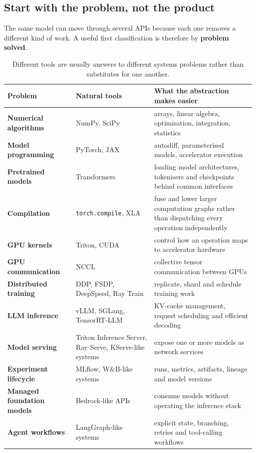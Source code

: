 \subsection{Start with the problem, not the product}

The same model can move through several APIs because each one removes a different kind of work.
A useful first classification is therefore by \textbf{problem solved}.

\begin{table}[ht]
\centering
\small
\begin{tabularx}{\textwidth}{>{\bfseries}p{2.6cm} X X}
\toprule
Problem & Natural tools & What the abstraction makes easier \\
\midrule
Numerical algorithms & NumPy, SciPy & arrays, linear algebra, optimisation, integration, statistics \\
Model programming & PyTorch, JAX & autodiff, parameterised models, accelerator execution \\
Pretrained models & Transformers & loading model architectures, tokenisers and checkpoints behind common interfaces \\
Compilation & \texttt{torch.compile}, XLA & fuse and lower larger computation graphs rather than dispatching every operation independently \\
GPU kernels & Triton, CUDA & control how an operation maps to accelerator hardware \\
GPU communication & NCCL & collective tensor communication between GPUs \\
Distributed training & DDP, FSDP, DeepSpeed, Ray Train & replicate, shard and schedule training work \\
LLM inference & vLLM, SGLang, TensorRT-LLM & KV-cache management, request scheduling and efficient decoding \\
Model serving & Triton Inference Server, Ray Serve, KServe-like systems & expose one or more models as network services \\
Experiment lifecycle & MLflow, W\&B-like systems & runs, metrics, artifacts, lineage and model versions \\
Managed foundation models & Bedrock-like APIs & consume models without operating the inference stack \\
Agent workflows & LangGraph-like systems & explicit state, branching, retries and tool-calling workflows \\
\bottomrule
\end{tabularx}
\caption{Different tools are usually answers to different systems problems rather than substitutes for one another.}
\label{tab:ml-api-problems}
\end{table}

